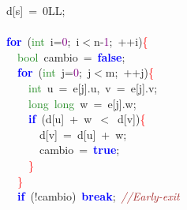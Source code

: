 {{\mbox{}\ \ d\textcolor{BrickRed}{[}s\textcolor{BrickRed}{]}\ \textcolor{BrickRed}{=}\ 0LL\textcolor{BrickRed}{;} \\
\mbox{} \\
\mbox{}\ \ \textbf{\textcolor{Blue}{for}}\ \textcolor{BrickRed}{(}\textcolor{ForestGreen}{int}\ i\textcolor{BrickRed}{=}\textcolor{Purple}{0}\textcolor{BrickRed}{;}\ i\textcolor{BrickRed}{$<$}n\textcolor{BrickRed}{-}\textcolor{Purple}{1}\textcolor{BrickRed}{;}\ \textcolor{BrickRed}{++}i\textcolor{BrickRed}{)}\textcolor{Red}{\{} \\
\mbox{}\ \ \ \ \textcolor{ForestGreen}{bool}\ cambio\ \textcolor{BrickRed}{=}\ \textbf{\textcolor{Blue}{false}}\textcolor{BrickRed}{;} \\
\mbox{}\ \ \ \ \textbf{\textcolor{Blue}{for}}\ \textcolor{BrickRed}{(}\textcolor{ForestGreen}{int}\ j\textcolor{BrickRed}{=}\textcolor{Purple}{0}\textcolor{BrickRed}{;}\ j\textcolor{BrickRed}{$<$}m\textcolor{BrickRed}{;}\ \textcolor{BrickRed}{++}j\textcolor{BrickRed}{)}\textcolor{Red}{\{} \\
\mbox{}\ \ \ \ \ \ \textcolor{ForestGreen}{int}\ u\ \textcolor{BrickRed}{=}\ e\textcolor{BrickRed}{[}j\textcolor{BrickRed}{].}u\textcolor{BrickRed}{,}\ v\ \textcolor{BrickRed}{=}\ e\textcolor{BrickRed}{[}j\textcolor{BrickRed}{].}v\textcolor{BrickRed}{;} \\
\mbox{}\ \ \ \ \ \ \textcolor{ForestGreen}{long}\ \textcolor{ForestGreen}{long}\ w\ \textcolor{BrickRed}{=}\ e\textcolor{BrickRed}{[}j\textcolor{BrickRed}{].}w\textcolor{BrickRed}{;} \\
\mbox{}\ \ \ \ \ \ \textbf{\textcolor{Blue}{if}}\ \textcolor{BrickRed}{(}d\textcolor{BrickRed}{[}u\textcolor{BrickRed}{]}\ \textcolor{BrickRed}{+}\ w\ \textcolor{BrickRed}{$<$}\ d\textcolor{BrickRed}{[}v\textcolor{BrickRed}{])}\textcolor{Red}{\{} \\
\mbox{}\ \ \ \ \ \ \ \ d\textcolor{BrickRed}{[}v\textcolor{BrickRed}{]}\ \textcolor{BrickRed}{=}\ d\textcolor{BrickRed}{[}u\textcolor{BrickRed}{]}\ \textcolor{BrickRed}{+}\ w\textcolor{BrickRed}{;} \\
\mbox{}\ \ \ \ \ \ \ \ cambio\ \textcolor{BrickRed}{=}\ \textbf{\textcolor{Blue}{true}}\textcolor{BrickRed}{;} \\
\mbox{}\ \ \ \ \ \ \textcolor{Red}{\}} \\
\mbox{}\ \ \ \ \textcolor{Red}{\}} \\
\mbox{}\ \ \ \ \textbf{\textcolor{Blue}{if}}\ \textcolor{BrickRed}{(!}cambio\textcolor{BrickRed}{)}\ \textbf{\textcolor{Blue}{break}}\textcolor{BrickRed}{;}\ \textit{\textcolor{Brown}{//Early-exit}} \\
}}
